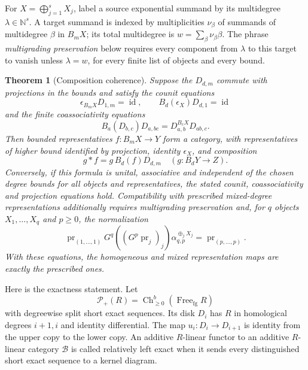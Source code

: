 \documentclass[11pt,a4paper]{article}
\newtheorem{theorem}{Theorem}[section]
\theoremstyle{definition}
\newcommand{\id}{\operatorname{id}}
\begin{document}
For $X=\bigoplus_{j=1}^sX_j$, label a source exponential summand by its multidegree $\lambda\in\mathbb N^s$. A target summand is indexed by multiplicities $\nu_\beta$ of summands of multidegree $\beta$ in $B_mX$; its total multidegree is $w=\sum_\beta\nu_\beta\beta$. The phrase \emph{multigrading preservation} below requires every component from $\lambda$ to this target to vanish unless $\lambda=w$, for every finite list of objects and every bound.

\begin{theorem}[Composition coherence]\label{prop:coherence}
Suppose the $D_{d,m}$ commute with projections in the bounds and satisfy the counit equations
\[
 \epsilon_{B_mX}D_{1,m}=\id,
 \qquad B_d(\epsilon_X)D_{d,1}=\id
\]
and the finite coassociativity equations
\[
 B_a(D_{b,c})D_{a,bc}=D_{a,b}^{B_cX}D_{ab,c}.
\]
Then bounded representatives $f:B_mX\to Y$ form a category, with representatives of higher bound identified by projection, identity $\epsilon_X$, and composition
\[
 g*f=g\,B_d(f)D_{d,m}\quad(g:B_dY\to Z).
\]
Conversely, if this formula is unital, associative and independent of the chosen degree bounds for all objects and representatives, the stated counit, coassociativity and projection equations hold. Compatibility with prescribed mixed-degree representations additionally requires multigrading preservation and, for $q$ objects $X_1,\ldots,X_q$ and $p\ge0$, the normalization
\[
 \operatorname{pr}_{(1,\ldots,1)}G^q((G^p\operatorname{pr}_j)_j)
 \alpha_{q,p}^{\oplus_jX_j}
 =\operatorname{pr}_{(p,\ldots,p)}.
\]
With these equations, the homogeneous and mixed representation maps are exactly the prescribed ones.
\end{theorem}

Here is the exactness statement. Let
\[
 \mathcal P_+(R)=\operatorname{Ch}^b_{\ge0}(\operatorname{Free}_{\mathrm{fg}}R)
\]
with degreewise split short exact sequences. Its disk $D_i$ has $R$ in homological degrees $i+1,i$ and identity differential. The map $u_i:D_i\to D_{i+1}$ is identity from the upper copy to the lower copy. An additive $R$-linear functor to an additive $R$-linear category $\mathcal B$ is called relatively left exact when it sends every distinguished short exact sequence to a kernel diagram.
\end{document}
